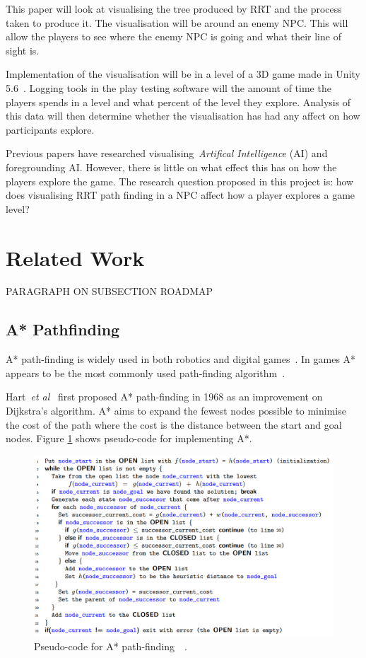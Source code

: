 \documentclass[journal]{IEEEtran}
\begin{document}
This paper will look at visualising the tree produced by RRT and the process taken to produce it. The visualisation will be around an enemy NPC. This will allow the players to see where the enemy NPC is going and what their line of sight is. 

Implementation of the visualisation will be in a level of a 3D game made in Unity 5.6~\cite{software:Unity}. Logging tools in the play testing software will  the amount of time the players spends in a level and what percent of the level they explore. Analysis of this data will then determine whether the visualisation has had any affect on how participants explore.

Previous papers have researched visualising~\textit{Artifical Intelligence} (AI) and foregrounding AI. However, there is little on what effect this has on how the players explore the game.
The research question proposed in this project is: how does visualising RRT path finding in a NPC affect how a player explores a game level?

\section{Related Work} \label{RelatedWork}
PARAGRAPH ON SUBSECTION ROADMAP

\subsection{A* Pathfinding} \label{A*PF}
A* path-finding is widely used in both robotics and digital games~\cite{Algfoor2015}. In games A* appears to be the most commonly used path-finding algorithm~\cite{Algfoor2015}.

Hart~\textit{et al}~\cite{Hart1968} first proposed A* path-finding in 1968 as an improvement on Dijkstra's algorithm. A* aims to expand the fewest nodes possible to minimise the cost of the path where the cost is the distance between the start and  goal nodes. Figure \ref{A*Pseudo} shows pseudo-code for implementing A*. 

\begin{figure}[h]
	\includegraphics[width=1.0\linewidth]{APseudocode.png}
	\caption{ Pseudo-code for A* path-finding~\cite{Hart1968}~\cite{pseudocode:A*}.}
	\label{A*Pseudo}
\end{figure} 
\end{document}
